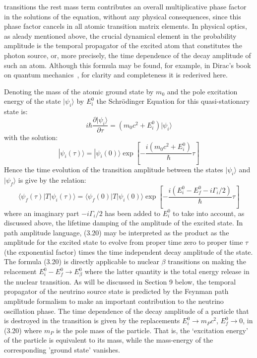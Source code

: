 \documentclass [12pt]{article}
\begin{document}
{  transitions the rest mass term contributes an overall multiplicative phase factor
  in the solutions of the equation, without any physical consequences, since this phase 
  factor cancels in all atomic transition matrix elements. In physical optics, as aleady 
  mentioned above, the crucial dynamical element in the probability amplitude
  is the temporal propagator of the excited atom that constitutes the photon source,
  or, more precisely, the time dependence of the decay amplitude of such an atom.
  Although this formula may be found, for example, in Dirac's book
  on quantum mechanics~\cite{Diracprop}, for clarity and completeness it 
  is rederived here. 
   \par Denoting the mass of the atomic ground state by $m_0$ and the pole excitation
  energy of the state $|\psi_i\rangle$ by $E^{0}_i$
  the  Schr\"{o}dinger Equation for this quasi-stationary state is:
  \begin{equation}
  i\hbar \frac{\partial |\psi_i\rangle}{\partial \tau} = (m_0 c^2+ E^{0}_i)|\psi_i\rangle
  \end{equation}
  with the solution:
 \begin{equation}
|\psi_i(\tau)\rangle = |\psi_i(0)\rangle\exp\left[-\frac{i( m_0 c^2 + E^{0}_i)}{\hbar} \tau \right] 
  \end{equation}
 Hence the time evolution of the transition amplitude between the states  $|\psi_i\rangle$ and
 $|\psi_f\rangle$ is give by the relation:
 \begin{equation}
 \langle \psi_f(\tau)|T|\psi_i(\tau)\rangle = \langle \psi_f(0)|T|\psi_i(0)\rangle 
   \exp\left[-\frac{i(E^{0}_i- E^{0}_f-i\Gamma_i/2)}{\hbar} \tau \right] 
   \end{equation}
  where an imaginary part $-i\Gamma_i/2$ has been added to $E^{0}_i$ to take into account, as discussed
  above, the lifetime damping of the amplitude of the excited state. In path amplitude 
  language, (3.20) may be interpreted as the product as the amplitude for the excited state to evolve 
  from proper time zero to proper time $\tau$ (the exponential factor) times the time independent
  decay amplitude of the state.  The formula (3.20) is directly applicable to nuclear $\beta$ transitions
   on making the relacement $E^{0}_i- E^{0}_f \rightarrow E^{0}_{\beta}$ where the latter
   quantity is the total energy release in the nuclear transition. As will be discussed in 
    Section 9 below, the temporal  propagator of the neutrino source state is predicted
    by the Feynman path amplitude formalism to make an important contribution to the
    neutrino oscillation phase. The time dependence of the decay amplitude of a particle
  that is destroyed in the transition is given by the replacements $E^{0}_i \rightarrow m_P c^2$,
   $E^{0}_f \rightarrow 0$, in (3.20) where $m_ P$ is the pole mass of the particle.
   That is, the `excitation energy' of the particle is equivalent to its mass, while the mass-energy 
   of the corresponding 'ground state' vanishes.

}
\end{document}
